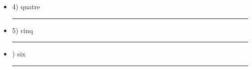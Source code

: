 \begin{itemize}
\item 4) quatre \rule{2\textwidth}{3pt}
\item 5) cinq \rule{2\textwidth}{3pt}
\item {}) six \rule{2\textwidth}{3pt}
\end{itemize}
